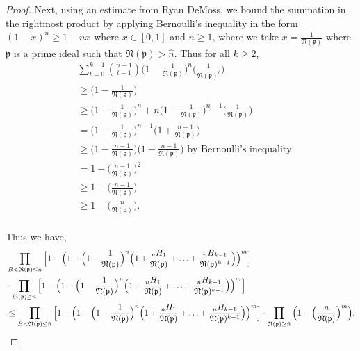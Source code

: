 \documentclass[10pt,a4paper]{article}
\newcommand{\f}[1]{\mathfrak{#1}}
\begin{document}
\begin{proof}
		Next, using an estimate from Ryan DeMoss, we bound the summation in the rightmost product by applying Bernoulli's inequality in the form $(1 - x)^n \geq 1 - nx$ where $x \in [0, 1]$ and $n \geq 1$, where we take $x = \frac{1}{\f{N}(\f{p})}$ where $\f{p}$ is a prime ideal such that $\f{N}(\f{p}) > \hat{n}$. Thus for all $k\geq2$,
		\begin{align*}
			&\sum_{t=0}^{k-1}\binom{n-1}{t-1}\Big(1-\frac{1}{\f{N}(\f{p})}\Big)^n\Big(\frac{1}{\f{N}(\f{p})^t}\Big)\\ &\geq \Big(1-\frac{1}{\f{N}(\f{p})}\Big)\\
			&\geq\Big(1-\frac{1}{\f{N}(\f{p})}\Big)^n+n\Big(1-\frac{1}{\f{N}(\f{p})}\Big)^{n-1}\Big(\frac{1}{\f{N}(\f{p})}\Big)\\
			&=\Big(1-\frac{1}{\f{N}(\f{p})}\Big)^{n-1}\Big(1+\frac{n-1}{\f{N}(\f{p})}\Big)\\
			&\geq\Big(1-\frac{n-1}{\f{N}(\f{p})}\Big)\Big(1+\frac{n-1}{\f{N}(\f{p})}\Big) \text{ by Bernoulli's inequality}\\
			&=1-\Big(\frac{n-1}{\f{N}(\f{p})}\Big)^2\\
			&\geq 1-\Big(\frac{n-1}{\f{N}(\f{p})}\Big)\\
			&\geq 1-\Big(\frac{n}{\f{N}(\f{p})}\Big).\\
		\end{align*}
		
		Thus we have,
		\begin{align*}
			&\prod_{B<\f{N}(\f{p})\leq\hat{n}} \Big[1 - \Big(1 -\Big(1-\frac{1}{\f{N}(\f{p})}\Big)^n\Big(1+\frac{{}_nH_1}{\f{N}(\f{p})}+\mathellipsis+\frac{{}_nH_{k-1}}{\f{N}(\f{p})^{k-1}}\Big)\Big)^m\Big]\\
			&\cdot\prod_{\f{N}(\f{p})\geq\hat{n}} \Big[1 - \Big(1 -\Big(1-\frac{1}{\f{N}(\f{p})}\Big)^n\Big(1+\frac{{}_nH_1}{\f{N}(\f{p})}+\mathellipsis+\frac{{}_nH_{k-1}}{\f{N}(\f{p})^{k-1}}\Big)\Big)^m\Big]\\
			&\leq\prod_{B<\f{N}(\f{p})\leq\hat{n}} \Big[1 - \Big(1 -\Big(1-\frac{1}{\f{N}(\f{p})}\Big)^n\Big(1+\frac{{}_nH_1}{\f{N}(\f{p})}+\mathellipsis+\frac{{}_nH_{k-1}}{\f{N}(\f{p})^{k-1}}\Big)\Big)^m\Big]\cdot \prod_{\f{N}(\f{p})\geq\hat{n}} \Big(1 - \Big(\frac{n}{\f{N}(\f{p})}\Big)^m\Big).\\
		\end{align*}
		
		\vspace{.1 in}
		

\end{proof}
\end{document}
